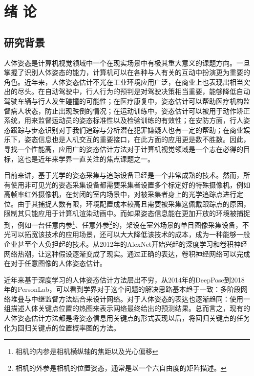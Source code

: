 \chapter{绪 论}
\label{cha:intro}


\section{研究背景}
\label{sec:generalbackground}
人体姿态是计算机视觉领域中一个在现实场景中有极其重大意义的课题方向。一旦掌握了识别人体姿态的能力，计算机可以在各种与人有关的互动中扮演更为重要的角色。近年来，人体姿态估计不光在工业环境应用广泛，在商业上也表现出相当突出的尽头。在自动驾驶中，行人行为的预判是对驾驶决策相当重要，能够降低自动驾驶车辆与行人发生碰撞的可能性；在医疗康复中，姿态估计可以帮助医疗机构监督病人状态，防止出现跌倒的情况；在运动训练中，姿态估计可以被用于动作矫正系统，用来监督运动员的姿态标准性以及检验训练的有效性；在安防方面，行人姿态跟踪与步态识别对于我们追踪与分析潜在犯罪嫌疑人也有一定的帮助；在商业娱乐下，姿态信息也是人机交互的重要接口，在此方面的应用更是数不胜数。因此，寻找一个性能高，应用广的姿态估计方法对于计算机视觉领域是一个志在必得的目标，这也是近年来学界一直关注的焦点课题之一。

目前来讲，基于光学的姿态采集与追踪设备已经是一个非常成熟的技术。然而，所有使用非可见光的姿态采集设备都需要采集者设置多个标定好的特殊摄像机，例如高帧率红外摄像机，在封闭的室内场景中，对被采集者身上的光学追踪点进行定位。由于其捕捉人数有限，环境配置成本较高且需要被采集这佩戴跟踪点的原因，限制其只能应用于计算机渲染动画中。而如果姿态信息能在更加开放的环境被捕捉到，例如一台任意内参\footnote{相机的内参是相机横纵轴的焦距以及光心偏移}、任意外参\footnote{相机的外参是相机的位置姿态，通常是以一个六自由度的矩阵描述。}的，架设在室外场景的单目图像采集设备，不光可以拓宽该技术的应用场景，还可以大大降低该技术的成本，成为一种能够一般企业甚至个人负担起的技术。从2012年的AlexNet\cite{alex2012alexnet}开始兴起的深度学习和卷积神经网络热潮，让这种假设逐渐变成了现实。通过正确的表达，卷积神经网络可以完成在对于任意图像的人体姿态估计。

近年来基于深度学习的人体姿态估计方法层出不穷，从2014年的DeepPose\cite{toshev2014deeppose}到2018年的PersonLab\cite{Papandreou2018PersonLab}，可以看到学界对于这个问题的解决思路基本趋于一致：多阶段网络堆叠与中继监督方法结合来设计网络。对于人体姿态的表达也逐渐趋同：使用一组描述人体关键点位置的热图来表示网络最终给出的预测结果。总而言之，现有的人体姿态估计方法都是将姿态信息用关键点的形式表现以后，将回归关键点的任务化为回归关键点的位置概率图的方法。

